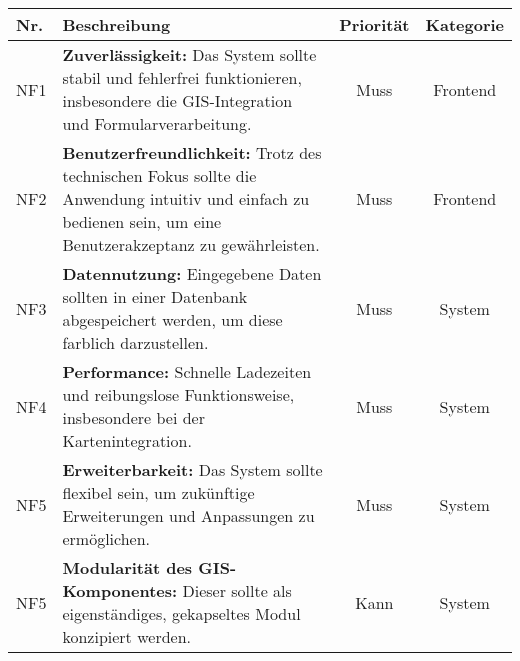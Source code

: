 \begin{center}
\begin{tabular}{l p{8cm} c c}
    \hline
    \textbf{Nr.} & \textbf{Beschreibung} & \textbf{Priorität} & \textbf{Kategorie} \\ \hline
    NF1 & \textbf{Zuverlässigkeit:} Das System sollte stabil und fehlerfrei funktionieren, insbesondere die GIS-Integration und Formularverarbeitung. &Muss &Frontend \\ 
    NF2 & \textbf{Benutzerfreundlichkeit:} Trotz des technischen Fokus sollte die Anwendung intuitiv und einfach zu bedienen sein, um eine Benutzerakzeptanz zu gewährleisten. &Muss &Frontend \\ 
    NF3 & \textbf{Datennutzung:} Eingegebene Daten sollten in einer Datenbank abgespeichert werden, um diese farblich darzustellen. &Muss &System \\ 
    NF4 & \textbf{Performance:} Schnelle Ladezeiten und reibungslose Funktionsweise, insbesondere bei der Kartenintegration. &Muss &System \\
    NF5 & \textbf{Erweiterbarkeit:} Das System sollte flexibel sein, um zukünftige Erweiterungen und Anpassungen zu ermöglichen. &Muss &System \\
    NF5 & \textbf{Modularität des GIS-Komponentes:} Dieser sollte als eigenständiges, gekapseltes Modul konzipiert werden. &Kann &System \\ \hline
\end{tabular}
\end{center}
\label{tab:nichtFunktionaleAnforderungen}



